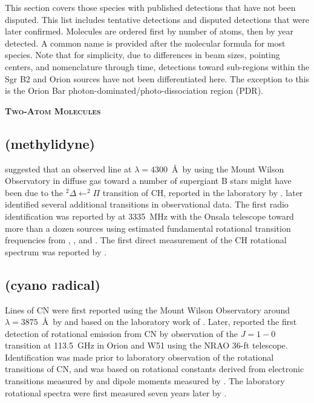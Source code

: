 \documentclass[twocolumn]{aastex631}
\begin{document}
This section covers those species with published detections that have not been disputed.  This list includes tentative detections and disputed detections that were later confirmed.  Molecules are ordered first by number of atoms, then by year detected.  A common name is provided after the molecular formula for most species.  Note that for simplicity, due to differences in beam sizes, pointing centers, and nomenclature through time, detections toward sub-regions within the Sgr B2 and Orion sources have not been differentiated here. The exception to this is the Orion Bar photon-dominated/photo-dissociation region (PDR).

    
    \begin{center}
        \large
        \textsc{\textbf{Two-Atom Molecules}}
        \label{2atoms}
        \normalsize
    \end{center}        

    \subsection{ (methylidyne)}
    \label{CH}
    
    \citet{Swings:1937dl} suggested that an observed line at $\lambda = 4300$~\AA~by \citet{Dunham:1937nj} using the Mount Wilson Observatory in diffuse gas toward a number of supergiant B stars might have been due to the $^2\Delta \leftarrow ^2\Pi$ transition of CH, reported in the laboratory by \citet{Jevons:1932id}.  \citet{McKellar:1940io} later identified several additional transitions in observational data.  The first radio identification was reported by \citet{Rydbeck:1973dp} at 3335~MHz with the Onsala telescope toward more than a dozen sources using estimated fundamental rotational transition frequencies from \citet{Shklovskii:1953me}, \citet{Goss:1966mn}, and \citet{Baird:1971yb}.  The first direct measurement of the CH rotational spectrum was reported by \citet{Brazier:1983jh}. 

    \subsection{ (cyano radical)}
    \label{CN}
    
    Lines of CN were first reported using the Mount Wilson Observatory around $\lambda = 3875$~\AA~by \citet{McKellar:1940io} and \citet{Adams:1941tj} based on the laboratory work of \citet{Jenkins:1938go}. Later, \citet{Jefferts:1970ld} reported the first detection of rotational emission from CN by observation of the $J = 1-0$ transition at 113.5~GHz in Orion and W51 using the NRAO 36-ft telescope.  Identification was made prior to laboratory observation of the rotational transitions of CN, and was based on rotational constants derived from electronic transitions measured by \citet{Poletto:1965uf} and dipole moments measured by \citet{Thomson:1968jl}.  The laboratory rotational spectra were first measured seven years later by \citet{Dixon:1977yc}. 
    
\end{document}

